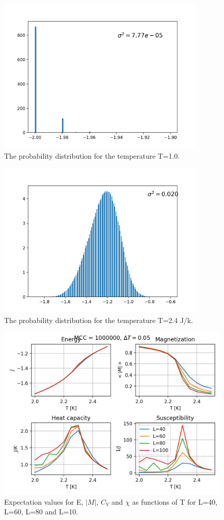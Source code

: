 \documentclass{article}
\begin{document}
\begin{figure}[H]
	\centering
	\includegraphics[width=100mm]{Hist_1.png}
	\caption{The probability distribution for the temperature T=1.0.}
	\label{fig:pd1}
\end{figure}

\begin{figure}[H]
	\centering
	\includegraphics[width=100mm]{Hist_24.png}
	\caption{The probability distribution for the temperature T=2.4 J/k.}
	\label{fig:pd24}
\end{figure}

\begin{figure}[H]
	\centering
	\includegraphics[width=\linewidth]{Exp_values.png}
	\caption{Expectation values for E, $|M|$, $C_V$ and $\chi$ as functions of T for L=40, L=60, L=80 and L=10.}
	\label{fig:exp}
\end{figure}
\end{document}
